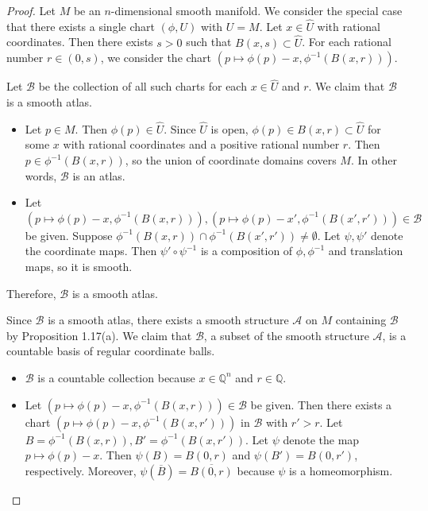 \begin{proof}
  Let $M$ be an $n$-dimensional smooth manifold.
  We consider the special case that there exists a single chart $(\phi, U)$ with $U = M$.
  Let $x \in \hat{U}$ with rational coordinates.
  Then there exists $s > 0$ such that $B(x, s) \subset \hat{U}$.
  For each rational number $r \in (0, s)$, we consider the chart $(p \mapsto \phi(p) - x, \phi^{-1}(B(x, r)))$.

  Let $\mathcal{B}$ be the collection of all such charts for each $x \in \hat{U}$ and $r$.
  We claim that $\mathcal{B}$ is a smooth atlas.
  \begin{itemize}
    \item
      Let $p \in M$.
      Then $\phi(p) \in \hat{U}$.
      Since $\hat{U}$ is open, $\phi(p) \in B(x, r) \subset \hat{U}$ for some $x$ with rational coordinates and a positive rational number $r$.
      Then $p \in \phi^{-1}(B(x, r))$, so the union of coordinate domains covers $M$.
      In other words, $\mathcal{B}$ is an atlas.
    \item
      Let $(p \mapsto \phi(p) - x, \phi^{-1}(B(x, r))), (p \mapsto \phi(p) - x', \phi^{-1}(B(x', r'))) \in \mathcal{B}$ be given.
      Suppose $\phi^{-1}(B(x, r)) \cap \phi^{-1}(B(x', r')) \ne \emptyset$.
      Let $\psi, \psi'$ denote the coordinate maps.
      Then $\psi' \circ \psi^{-1}$ is a composition of $\phi, \phi^{-1}$ and translation maps, so it is smooth.
  \end{itemize}
  Therefore, $\mathcal{B}$ is a smooth atlas.

  Since $\mathcal{B}$ is a smooth atlas, there exists a smooth structure $\mathcal{A}$ on $M$ containing $\mathcal{B}$ by Proposition 1.17(a).
  We claim that $\mathcal{B}$, a subset of the smooth structure $\mathcal{A}$, is a countable basis of regular coordinate balls.

  \begin{itemize}
    \item
      $\mathcal{B}$ is a countable collection because $x \in \mathbb{Q}^n$ and $r \in \mathbb{Q}$.
    \item
      Let $(p \mapsto \phi(p) - x, \phi^{-1}(B(x, r))) \in \mathcal{B}$ be given.
      Then there exists a chart $(p \mapsto \phi(p) - x, \phi^{-1}(B(x, r')))$ in $\mathcal{B}$ with $r' > r$.
      Let $B = \phi^{-1}(B(x, r)), B' = \phi^{-1}(B(x, r'))$.
      Let $\psi$ denote the map $p \mapsto \phi(p) - x$.
      Then $\psi(B) = B(0, r)$ and $\psi(B') = B(0, r')$, respectively.
      Moreover, $\psi(\overline{B}) = \overline{B(0, r)}$ because $\psi$ is a homeomorphism.
  \end{itemize}


\end{proof}
